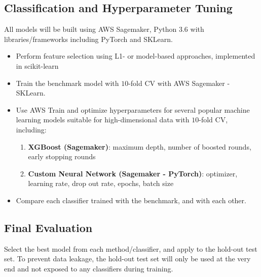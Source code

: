 \documentclass[11pt]{diazessay}
\begin{document}
\subsection{Classification and Hyperparameter Tuning}

All models will be built using AWS Sagemaker, Python 3.6 with libraries/frameworks including PyTorch and SKLearn.

\begin{itemize}
	\item Perform feature selection using L1- or model-based approaches, implemented in scikit-learn
	\item Train the benchmark model with $10$-fold CV with AWS Sagemaker - SKLearn.
	\item Use AWS Train and optimize hyperparameters for several popular machine learning models suitable for high-dimensional data with $10$-fold CV, including: 
	\begin{enumerate}
		\item \textbf{XGBoost (Sagemaker)}: maximum depth, number of boosted rounds, early stopping rounds
		\item \textbf{Custom Neural Network (Sagemaker - PyTorch)}: optimizer, learning rate, drop out rate, epochs, batch size
	\end{enumerate}
	\item Compare each classifier trained with the benchmark, and with each other.
\end{itemize} 

\subsection{Final Evaluation}

Select the best model from each method/classifier, and apply to the hold-out test set. To prevent data leakage, the hold-out test set will only be used at the very end and not exposed to any classifiers during training. 

\vskip0.4in



\end{document}
